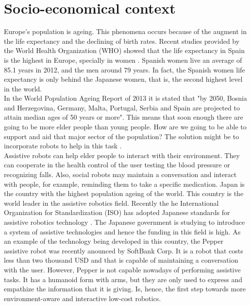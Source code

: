 \section{Socio-economical context}
\label{context}
Europe's population is ageing.
This phenomena occurs because of the augment in the life expectancy and the declining of birth rates. 
Recent studies provided by the World Health Organization (WHO) showed that the life expectancy in Spain is the highest in Europe, specially in women \cite{who_live_expectancy}.
Spanish women live an average of  85.1 years in 2012, and the men around 79 years. 
In fact, the Spanish women life expectancy is only behind the Japanese women, that is, the second highest level in the world. 
\\

In the World Population Ageing Report of 2013 it is stated that "by 2050, Bosnia and
Herzegovina, Germany, Malta, Portugal, Serbia and Spain are projected to attain median ages of
50 years or more"\cite{world_population_ageing}. 
This means that soon enough there are going to be more elder people than young people. 
How are we going to be able to support and aid that major sector of the population?
The solution might be to incorporate robots to help in this task \cite{Broekens2009}. 
\\

Assistive robots can help elder people to interact with their environment. 
They can cooperate in the health control of the user testing the blood pressure or recognizing falls. 
Also, social robots may maintain a conversation and interact with people, for example, reminding them to take a specific medication. 
Japan is the country with the highest population ageing of the world. 
This country is the world leader in the assistive robotics field. 
Recently the he International Organization for Standardization (ISO) has adopted Japanese standards for assistive robotics technology \cite{japan1}\cite{japan2}.
The Japanese government is studying to introduce a system of assistive technologies and hence the funding in this field is high. 
As an example of the technology being developed in this country, the Pepper assistive robot was recently anounced by SoftBank Corp\cite{cheap_humanoid}.
It is a robot that costs less than two thousand USD and that is capable of maintaining a conversation with the user. 
However, Pepper is not capable nowadays of performing assistive tasks. 
It has a humanoid form with arms, but they are only used to express and empathize the information that it is giving. 
Is, hence, the first step towards more environment-aware and interactive low-cost robotics.
\\

